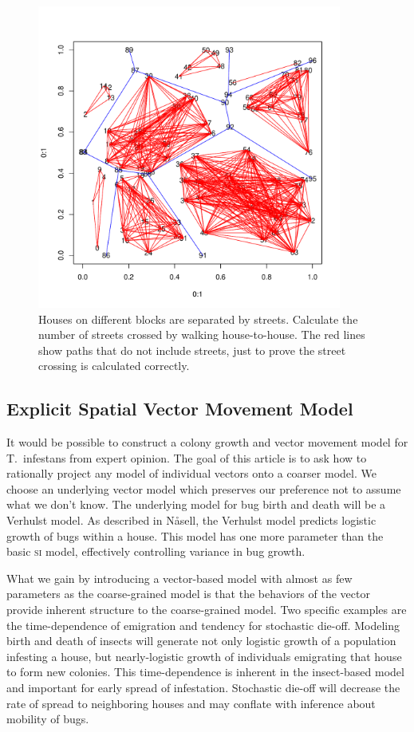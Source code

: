 \documentclass{article}
\begin{document}
\begin{figure}
\centerline{\includegraphics[width=10cm]{blocks.pdf}}
\caption{Houses on different blocks are separated by streets.
Calculate the number of streets crossed by walking house-to-house.
The red lines show paths that do not include streets,
just to prove the street crossing is calculated correctly.\label{fig:blocks}}
\end{figure}

\subsection{Explicit Spatial Vector Movement Model}
It would be possible to construct a colony growth and
vector movement model for T.\ infestans from expert opinion.
The goal of this article is to ask how to rationally project
any model of individual vectors onto a coarser model.
We choose an underlying vector model which preserves
our preference not to assume what we don't know.
The underlying model for bug birth and death will be
a Verhulst model. As described in N{\aa}sell\cite{Nasell2001},
the Verhulst model predicts logistic growth of bugs within
a house. This model has one more parameter than the
basic \textsc{si} model, effectively controlling variance in
bug growth.

What we gain by introducing a vector-based model with
almost as few parameters as the coarse-grained model is
that the behaviors of the vector provide inherent structure
to the coarse-grained model. Two specific examples
are the time-dependence of emigration and tendency for
stochastic die-off. Modeling birth
and death of insects will generate not only logistic
growth of a population infesting a house, but nearly-logistic
growth of individuals emigrating that house to form new
colonies. This time-dependence is inherent in the insect-based
model and important for early spread of infestation.
Stochastic die-off will decrease the rate of spread
to neighboring houses and may conflate with inference
about mobility of bugs.
\end{document}
